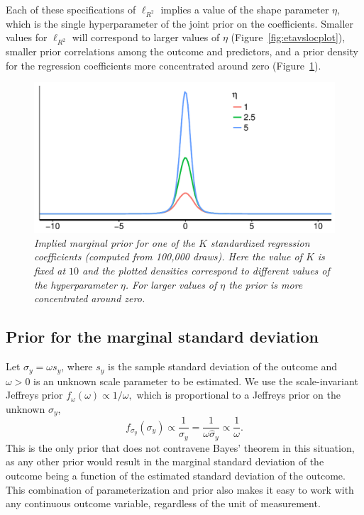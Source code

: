 \documentclass[11pt]{article}
\newcommand{\locRsq}{\ell_{R^2}}
\begin{document}
Each of these specifications of $\locRsq$ implies a value of the shape parameter
$\eta$, which is the single hyperparameter of the joint prior on the
coefficients. Smaller values for $\locRsq$ will correspond to larger values of
$\eta$ (Figure~\ref{fig:etavslocplot}), smaller prior correlations among the
outcome and predictors, and a prior density for the regression coefficients more
concentrated around zero (Figure~\ref{fig:betaplot}).

\begin{figure}
\centering
\includegraphics[width=.67\textwidth]{betaplot.pdf}{\vspace{-.25cm}}
\caption{\em \small Implied marginal prior for one of the $K$ standardized
regression coefficients (computed from 100,000 draws). Here the value of $K$ is
fixed at $10$ and the plotted densities correspond to different values of the
hyperparameter $\eta$. For larger values of $\eta$ the prior is more
concentrated around zero.}
\label{fig:betaplot}
\end{figure}

\subsection{Prior for the marginal standard deviation}
\label{subsec:marginalSD}
Let $\sigma_y = \omega s_y$, where $s_y$ is the sample standard deviation of the
outcome and $\omega > 0$ is an unknown scale parameter to be estimated. We use
the scale-invariant Jeffreys prior
$f_\omega \left(\omega\right) \propto 1 / \omega,$
which is proportional to a Jeffreys prior on the unknown $\sigma_y$,
$$f_{\sigma_y} \left(\sigma_y\right) \propto \frac{1}{\sigma_y}
= \frac{1}{\omega \widehat{\sigma}_y} \propto \frac{1}{\omega}.$$
This is the only prior that does not contravene Bayes' theorem in this
situation, as any other prior would result in the marginal standard deviation of
the outcome being a function of the estimated standard deviation of the outcome.
This combination of parameterization and prior also makes it easy to work with
any continuous outcome variable, regardless of the unit of measurement.
\end{document}
